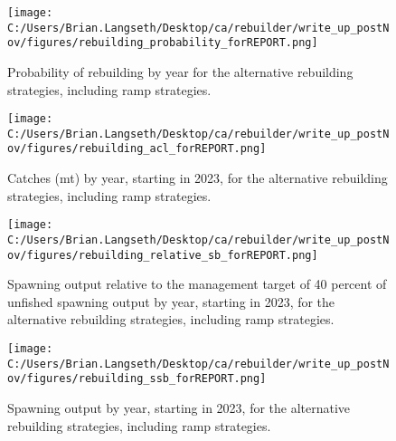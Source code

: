 \documentclass[11pt,
  english,
  letterpaper,
]{article}
\begin{document}
\begin{figure}
\centering
\texttt{[image: C:/Users/Brian.Langseth/Desktop/ca/rebuilder/write\_up\_postNov/figures/rebuilding\_probability\_forREPORT.png]}
\caption{Probability of rebuilding by year for the alternative rebuilding strategies, including ramp strategies.\label{fig:prob-fig}}
\end{figure}

\tagmcend\tagstructend


\begin{figure}
\centering
\texttt{[image: C:/Users/Brian.Langseth/Desktop/ca/rebuilder/write\_up\_postNov/figures/rebuilding\_acl\_forREPORT.png]}
\caption{Catches (mt) by year, starting in 2023, for the alternative rebuilding strategies, including ramp strategies.\label{fig:acl-fig}}
\end{figure}

\tagmcend\tagstructend


\begin{figure}
\centering
\texttt{[image: C:/Users/Brian.Langseth/Desktop/ca/rebuilder/write\_up\_postNov/figures/rebuilding\_relative\_sb\_forREPORT.png]}
\caption{Spawning output relative to the management target of 40 percent of unfished spawning output by year, starting in 2023, for the alternative rebuilding strategies, including ramp strategies.\label{fig:rel-ssb-fig}}
\end{figure}

\tagmcend\tagstructend


\begin{figure}
\centering
\texttt{[image: C:/Users/Brian.Langseth/Desktop/ca/rebuilder/write\_up\_postNov/figures/rebuilding\_ssb\_forREPORT.png]}
\caption{Spawning output by year, starting in 2023, for the alternative rebuilding strategies, including ramp strategies.\label{fig:ssb-fig}}
\end{figure}
\end{document}
